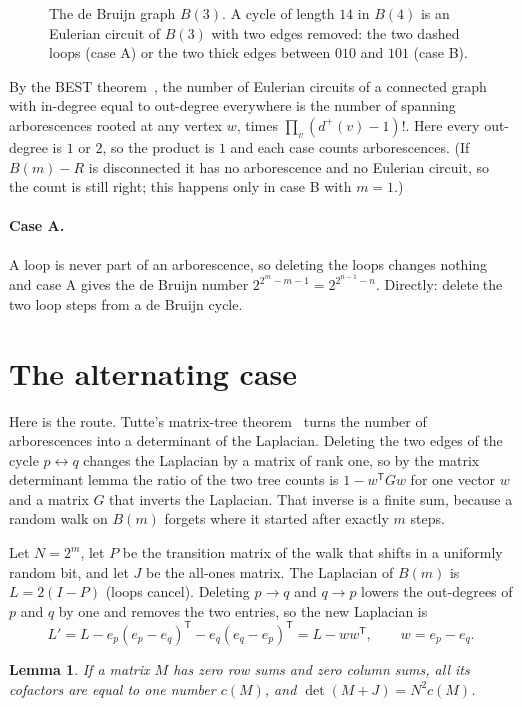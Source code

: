 \documentclass[11pt]{article}
\newtheorem{lemma}{Lemma}
\theoremstyle{remark}
\begin{document}
\begin{figure}[ht]
\centering

\caption{The de Bruijn graph $B(3)$. A cycle of length $14$ in $B(4)$ is an Eulerian circuit of $B(3)$ with
two edges removed: the two dashed loops (case A) or the two thick edges between $010$ and $101$ (case B).}
\label{fig:b3}
\end{figure}

By the BEST theorem~\cite{AEdB51,ST41}, the number of Eulerian circuits of a connected graph with in-degree
equal to out-degree everywhere is the number of spanning arborescences rooted at any vertex $w$, times
$\prod_v(d^+(v)-1)!$. Here every out-degree is $1$ or $2$, so the product is $1$ and each case counts
arborescences. (If $B(m)-R$ is disconnected it has no arborescence and no Eulerian circuit, so the count is
still right; this happens only in case B with $m=1$.)

\paragraph{Case A.} A loop is never part of an arborescence, so deleting the loops changes nothing and case A
gives the de Bruijn number $2^{2^m-m-1}=2^{2^{n-1}-n}$. Directly: delete the two loop steps from a de Bruijn
cycle.

\section{The alternating case}

Here is the route. Tutte's matrix-tree theorem~\cite{T48} turns the number of arborescences into a determinant
of the Laplacian. Deleting the two edges of the cycle $p\leftrightarrow q$ changes the Laplacian by a matrix of
rank one, so by the matrix determinant lemma the ratio of the two tree counts is $1-w^{\mathsf T}Gw$ for one
vector $w$ and a matrix $G$ that inverts the Laplacian. That inverse is a finite sum, because a random walk on
$B(m)$ forgets where it started after exactly $m$ steps.

Let $N=2^m$, let $P$ be the transition matrix of the walk that shifts in a uniformly random bit, and let $J$
be the all-ones matrix. The Laplacian of $B(m)$ is $L=2(I-P)$ (loops cancel). Deleting $p\to q$ and $q\to p$
lowers the out-degrees of $p$ and $q$ by one and removes the two entries, so the new Laplacian is
\[
L' = L - e_p(e_p-e_q)^{\mathsf T} - e_q(e_q-e_p)^{\mathsf T} = L - ww^{\mathsf T},\qquad w=e_p-e_q .
\]

\begin{lemma}\label{lem:cof}
If a matrix $M$ has zero row sums and zero column sums, all its cofactors are equal to one number $c(M)$, and
$\det(M+J)=N^2c(M)$.
\end{lemma}
\end{document}
